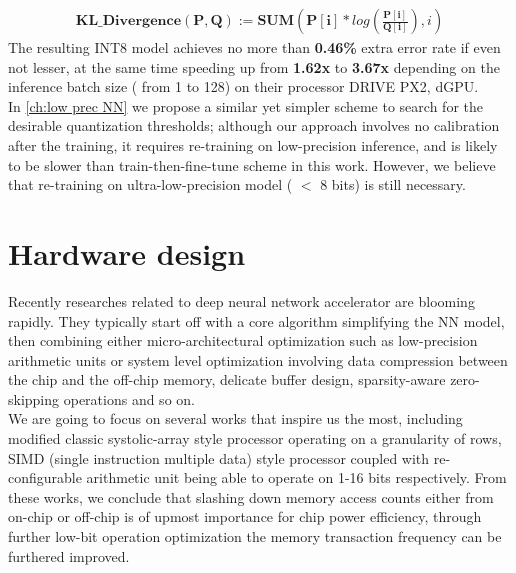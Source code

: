 \begin{equation}
    \begin{aligned}\label{eq:kl_div}
    \textbf{KL\_Divergence} ( \boldsymbol{P} , \boldsymbol{Q} ) := \textbf{SUM} ( \boldsymbol{P[i]} * log ( \frac{ \boldsymbol{P[i]}}{\boldsymbol{Q[i]}} ) , i)
    \end{aligned}
\end{equation}
The resulting INT8 model achieves no more than \textbf{0.46\%} extra error rate if even not lesser, at the same time speeding up from \textbf{1.62x} to \textbf{3.67x} depending on the inference batch size ( from 1 to 128) on their processor DRIVE PX2, dGPU. \\
In \autoref{ch:low prec NN} we propose a similar yet simpler scheme to search for the desirable quantization thresholds; although our approach involves no calibration after the training, it requires re-training on low-precision inference, and is likely to be slower than train-then-fine-tune scheme in this work. However, we believe that re-training on ultra-low-precision model ( $<$ 8 bits) is still necessary.

\section{Hardware design}
Recently researches related to deep neural network accelerator are blooming rapidly. They typically start off with a core algorithm simplifying the NN model, then combining either micro-architectural optimization such as low-precision arithmetic units or system level optimization involving data compression between the chip and the off-chip memory, delicate buffer design, sparsity-aware zero-skipping operations and so on. \\
We are going to focus on several works that inspire us the most, including modified classic systolic-array style processor operating on a granularity of rows, SIMD (single instruction multiple data) style processor coupled with re-configurable arithmetic unit being able to operate on 1-16 bits respectively.
From these works, we conclude that slashing down memory access counts either from on-chip or off-chip is of upmost importance for chip power efficiency, through further low-bit operation optimization the memory transaction frequency can be furthered improved. 
